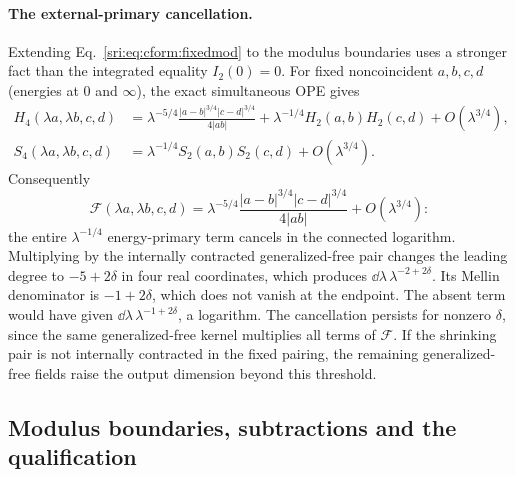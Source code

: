 \paragraph{The external-primary cancellation.} Extending Eq.~\eqref{sri:eq:cform:fixedmod} to the modulus boundaries uses a
stronger fact than the integrated equality $I_2(0)=0$. For fixed noncoincident $a,b,c,d$ (energies at $0$ and
$\infty$), the exact simultaneous OPE gives
\begin{equation}
\begin{aligned}
 H_4(\lambda a,\lambda b,c,d)&=\lambda^{-5/4}\frac{|a-b|^{3/4}|c-d|^{3/4}}{4|ab|}
 +\lambda^{-1/4}H_2(a,b)H_2(c,d)+O(\lambda^{3/4}),\\
 S_4(\lambda a,\lambda b,c,d)&=\lambda^{-1/4}S_2(a,b)S_2(c,d)+O(\lambda^{3/4}).
\end{aligned}
\end{equation}
Consequently
\begin{equation}
 \mathcal F(\lambda a,\lambda b,c,d)=\lambda^{-5/4}\frac{|a-b|^{3/4}|c-d|^{3/4}}{4|ab|}+O(\lambda^{3/4}):
 \label{sri:eq:cform:external}
\end{equation}
the entire $\lambda^{-1/4}$ energy-primary term cancels in the connected logarithm. Multiplying by the internally
contracted generalized-free pair changes the leading degree to $-5+2\delta$ in four real coordinates, which produces
$\dd\lambda\,\lambda^{-2+2\delta}$. Its Mellin denominator is $-1+2\delta$, which does not vanish at the endpoint. The
absent term would have given $\dd\lambda\,\lambda^{-1+2\delta}$, a logarithm. The cancellation persists for nonzero
$\delta$, since the same generalized-free kernel multiplies all terms of $\mathcal F$. If the shrinking pair is not
internally contracted in the fixed pairing, the remaining generalized-free fields raise the output dimension beyond
this threshold.

\subsection{Modulus boundaries, subtractions and the qualification}\label{sri:app:cform:qualification}
